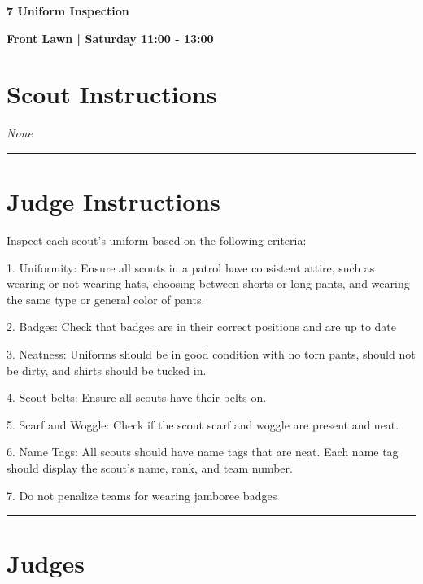 \documentclass[10pt]{article}
\newcommand{\newtitle}[1]{\begin{center}{\Huge\bfseries #1 }\\ \vspace{5mm}\end{center}}
\newcommand{\newsubtitle}[1]{\begin{center}{\color{grey}\Large\bfseries #1 }\\ \vspace{5mm}\end{center}}
\begin{document}
	\clearpage
		\newtitle{7 Uniform Inspection }
	\newsubtitle{Front Lawn | Saturday 11:00 - 13:00}
		\setcounter{section}{6}
	\section*{Scout Instructions}
		\textit{None}
	
	\vspace{0.5cm}
	\hrule
	\vspace{0.5cm}

		\section*{Judge Instructions}
		Inspect each scout's uniform based on the following criteria:



1. Uniformity: Ensure all scouts in a patrol have consistent attire, such as wearing or not wearing hats, choosing between shorts or long pants, and wearing the same type or general color of pants.

2. Badges: Check that badges are in their correct positions and are up to date

3. Neatness: Uniforms should be in good condition with no torn pants, should not be dirty, and shirts should be tucked in.

4. Scout belts: Ensure all scouts have their belts on.

5. Scarf and Woggle: Check if the scout scarf and woggle are present and neat.

6. Name Tags: All scouts should have name tags that are neat. Each name tag should display the scout's name, rank, and team number.

7. Do not penalize teams for wearing jamboree badges


\vspace{0.5cm}
	\hrule
	\vspace{0.5cm}
		\section*{\faUsers \: Judges}

		
\end{document}
